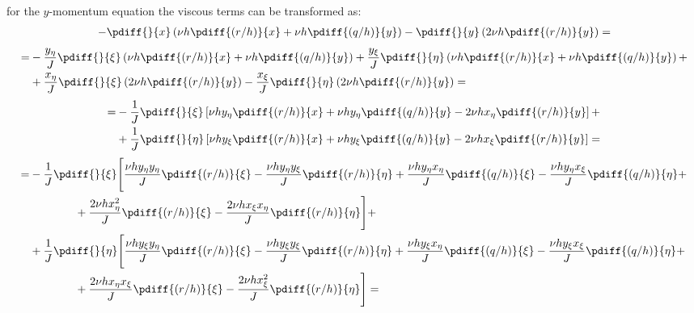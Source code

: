 %
for the $y$-momentum equation the viscous terms can be transformed as:
	\begin{align}
		\begin{aligned}
			- \pdiff{}{x}\left(\nu h\pdiff{(r/h)}{x} + \nu h \pdiff{(q/h)}{y} \right)
			- \pdiff{}{y}\left(2\nu h\pdiff{(r/h)}{y} \right) =
		\end{aligned}
	\end{align}
%
	\begin{align}
		\begin{aligned}
			=& - \frac{y_{\eta}}{J} \pdiff{}{\xi} \left( \nu h\pdiff{(r/h)}{x} + \nu h \pdiff{(q/h)}{y} \right)
			+ \frac{y_{\xi}}{J} \pdiff{}{\eta} \left(\nu h\pdiff{(r/h)}{x} + \nu h \pdiff{(q/h)}{y} \right) +
            \\
			& + \frac{x_{\eta}}{J} \pdiff{}{\xi} \left(2\nu h\pdiff{(r/h)}{y} \right)
			- \frac{x_{\xi}}{J} \pdiff{}{\eta} \left(2\nu h\pdiff{(r/h)}{y} \right) =
		\end{aligned}
	\end{align}
%
	\begin{align}
		\begin{aligned}
			=& - \frac{1}{J} \pdiff{}{\xi} \left[\nu h y_{\eta} \pdiff{(r/h)}{x} + \nu h y_{\eta} \pdiff{(q/h)}{y} - 2 \nu h x_{\eta} \pdiff{(r/h)}{y} \right] +
            \\
			&+ \frac{1}{J} \pdiff{}{\eta} \left[\nu h y_{\xi} \pdiff{(r/h)}{x} + \nu h y_{\xi} \pdiff{(q/h)}{y} - 2 \nu h x_{\xi} \pdiff{(r/h)}{y} \right] =
		\end{aligned}
	\end{align}
%
	\begin{align}
		\begin{aligned}
			=& - \frac{1}{J} \pdiff{}{\xi} \Bigg[\frac{\nu h y_{\eta}y_{\eta} }{J}  \pdiff{(r/h)}{\xi} - \frac{\nu h y_{\eta} y_{\xi}}{J} \pdiff{(r/h)}{\eta} + \frac{\nu h y_{\eta} x_{\eta}}{J} \pdiff{(q/h)}{\xi} - \frac{\nu h y_{\eta} x_{\xi}}{J} \pdiff{(q/h)}{\eta} +
            \\
			& \qquad \qquad + \frac{2 \nu h x_{\eta}^2}{J} \pdiff{(r/h)}{\xi} - \frac{2 \nu h x_{\xi} x_{\eta} }{J} \pdiff{(r/h)}{\eta} \Bigg]
            +
            \\
			&+ \frac{1}{J} \pdiff{}{\eta} \Bigg[\frac{\nu h y_{\xi} y_{\eta} }{J}\pdiff{(r/h)}{\xi} - \frac{\nu h y_{\xi} y_{\xi}}{J} \pdiff{(r/h)}{\eta} + \frac{\nu h y_{\xi} x_{\eta}}{J} \pdiff{(q/h)}{\xi} - \frac{\nu h y_{\xi} x_{\xi}}{J} \pdiff{(q/h)}{\eta} +
            \\
			& \qquad \qquad + \frac{2 \nu h x_{\eta}x_{\xi}}{J} \pdiff{(r/h)}{\xi} - \frac{2 \nu h x_{\xi}^2}{J} \pdiff{(r/h)}{\eta} \Bigg] =
		\end{aligned}
	\end{align}

